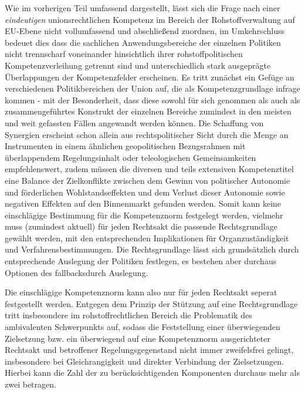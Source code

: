 \documentclass[12pt,a4paper,oneside]{book} %
\begin{document}
	Wie im vorherigen Teil umfassend dargestellt, lässt sich die Frage nach einer \textit{eindeutigen} unionsrechtlichen Kompetenz im Bereich der Rohstoffverwaltung auf EU-Ebene nicht vollumfassend und abschließend zuordnen, im Umkehrschluss bedeuet dies dass die sachlichen Anwendungsbereiche der einzelnen Politiken nicht trennscharf voneinander hinsichtlich ihrer rohstoffpolitischen Kompetenzverleihung getrennt sind und unterschiedlich stark ausgeprägte Überlappungen der Kompetenzfelder erscheinen. Es tritt zunächst ein Gefüge an verschiedenen Politikbereichen der Union auf, die als Kompetenzgrundlage infrage kommen - mit der Besonderheit, dass diese sowohl für sich genommen als auch als zusammengeführtes Konstrukt der einzelnen Bereiche zumindest in den meisten und weit gefassten Fällen angewandt werden können. Die Schaffung von Synergien erscheint schon allein aus rechtspolitischer Sicht durch die Menge an Instrumenten in einem ähnlichen geopolitischen Bezugsrahmen mit überlappendem Regelungsinhalt oder teleologischen Gemeinsamkeiten empfehlenswert, zudem müssen die diversen und teils extensiven Kompetenztitel eine Balance der Zielkonflikte zwischen dem Gewinn von politischer Autonomie und förderlichen Wohlstandseffekten und dem Verlust dieser Autonomie sowie negativen Effekten auf den Binnenmarkt gefunden werden.\autocite{Schäffer, EuZW 2023, 695, 700} Somit kann keine einschlägige Bestimmung für die Kompetenznorm festgelegt werden, vielmehr muss (zumindest aktuell) für jeden Rechtsakt die passende Rechtsgrundlage gewählt werden, mit den entsprechenden Implikationen für Organzuständigkeit und Verfahrensbestimmungen. Die Rechtsgrundlage lässt sich grundsätzlich durch entsprechende Auslegung der Politiken festlegen, es bestehen aber durchaus Optionen des \glqq fallbacks\grqq durch Auslegung. 
	
	Die einschlägige Kompetenznorm kann also nur für jeden Rechtsakt seperat festgestellt werden. Entgegen dem Prinzip der Stützung auf eine Rechtsgrundlage tritt insbesondere im rohstoffrechtlichen Bereich die Problematik des ambivalenten Schwerpunkts auf, sodass die Feststellung einer überwiegenden Zielsetzung bzw. ein überwiegend auf eine Kompetenznorm ausgerichteter Rechtsakt und betroffener Regelungsgegenstand nicht immer zweifelsfrei gelingt, insbesondere bei Gleichrangigkeit und direkter Verbindung der Zielsetzungen. Hierbei kann die Zahl der zu berücksichtigenden Komponenten durchaus mehr als zwei betragen.
	
\end{document}
